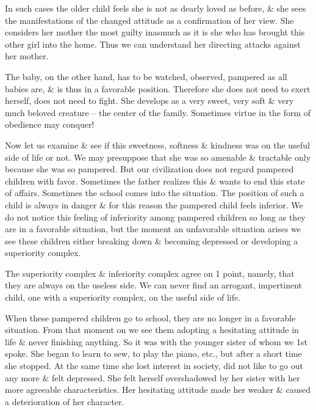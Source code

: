 \documentclass{article}
\begin{document}
In such cases the older child feels she is not as dearly loved as before, \& she sees the manifestations of the changed attitude as a confirmation of her view. She considers her mother the most guilty inasmuch as it is she who has brought this other girl into the home. Thus we can understand her directing attacks against her mother.

The baby, on the other hand, has to be watched, observed, pampered as all babies are, \& is thus in a favorable position. Therefore she does not need to exert herself, does not need to fight. She develops as a very sweet, very soft \& very much beloved creature -- the center of the family. Sometimes virtue in the form of obedience may conquer!

Now let us examine \& see if this sweetness, softness \& kindness was on the useful side of life or not. We may presuppose that she was so amenable \& tractable only because she was so pampered. But our civilization does not regard pampered children with favor. Sometimes the father realizes this \& wants to end this state of affairs. Sometimes the school comes into the situation. The position of such a child is always in danger \& for this reason the pampered child feels inferior. We do not notice this feeling of inferiority among pampered children so long as they are in a favorable situation, but the moment an unfavorable situation arises we see these children either breaking down \& becoming depressed or developing a superiority complex.

The superiority complex \& inferiority complex agree on 1 point, namely, that they are always on the useless side. We can never find an arrogant, impertinent child, one with a superiority complex, on the useful side of life.

When these pampered children go to school, they are no longer in a favorable situation. From that moment on we see them adopting a hesitating attitude in life \& never finishing anything. So it was with the younger sister of whom we 1st spoke. She began to learn to sew, to play the piano, etc., but after a short time she stopped. At the same time she lost interest in society, did not like to go out any more \& felt depressed. She felt herself overshadowed by her sister with her more agreeable characteristics. Her hesitating attitude made her weaker \& caused a deterioration of her character.
\end{document}
